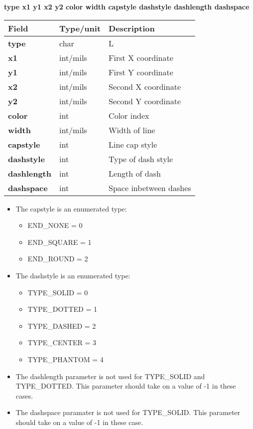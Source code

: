 \documentclass{article}
\begin{document}
{\bf type x1 y1 x2 y2 color width capstyle dashstyle dashlength dashspace}

\begin{table}[h]
\begin{tabular}{|l|l|l|} \hline
Field 		& Type/unit 	& Description \\ \hline 
\hline
{\bf type} 	& char 		& L \\ \hline
{\bf x1} 	& int/mils 	& First X coordinate \\ \hline
{\bf y1} 	& int/mils 	& First Y coordinate \\ \hline
{\bf x2} 	& int/mils 	& Second X coordinate \\ \hline
{\bf y2} 	& int/mils 	& Second Y coordinate \\ \hline
{\bf color} 	& int 		& Color index \\ \hline
{\bf width} 	& int/mils 	& Width of line \\ \hline
{\bf capstyle} 	& int 		& Line cap style \\ \hline
{\bf dashstyle} & int 		& Type of dash style \\ \hline
{\bf dashlength}& int 		& Length of dash \\ \hline
{\bf dashspace} & int 		& Space inbetween dashes \\ \hline
\end{tabular}
\end{table}

\begin{itemize}
\item The capstyle is an enumerated type: 
\begin{itemize}
	\item END\_NONE = 0
	\item END\_SQUARE = 1
	\item END\_ROUND = 2
\end{itemize}
\item The dashstyle is an enumerated type: 
\begin{itemize}
	\item TYPE\_SOLID = 0 
	\item TYPE\_DOTTED = 1
	\item TYPE\_DASHED = 2
	\item TYPE\_CENTER = 3
        \item TYPE\_PHANTOM = 4
\end{itemize}
\item The dashlength parameter is not used for TYPE\_SOLID and TYPE\_DOTTED.  
      This parameter should take on a value of -1 in these cases.
\item The dashspace paramater is not used for TYPE\_SOLID.
      This parameter should take on a value of -1 in these case.
\end{itemize}
\end{document}
